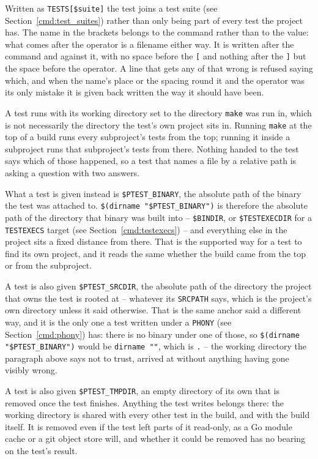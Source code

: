 \documentclass{article}
\begin{document}
Written as \texttt{TESTS[\$suite]} the test joins a test suite (see
Section~\ref{cmd:test_suites}) rather than only being part of every
test the project has.  The name in the brackets belongs to the command
rather than to the value: what comes after the operator is a filename
either way.  It is written after the command and against it, with no
space before the \texttt{[} and nothing after the \texttt{]} but the
space before the operator.  A line that gets any of that wrong is
refused saying which, and when the name's place or the spacing round
it and the operator was its only mistake it is given back written the
way it should have been.

A test runs with its working directory set to the directory
\texttt{make} was run in, which is not necessarily the directory the
test's own project sits in.  Running \texttt{make} at the top of a
build runs every subproject's tests from the top; running it inside a
subproject runs that subproject's tests from there.  Nothing handed to
the test says which of those happened, so a test that names a file by
a relative path is asking a question with two answers.

What a test is given instead is \texttt{\$PTEST\_BINARY}, the absolute
path of the binary the test was attached to.
\texttt{\$(dirname "\$PTEST\_BINARY")} is therefore the absolute path
of the directory that binary was built into -- \texttt{\$BINDIR}, or
\texttt{\$TESTEXECDIR} for a \texttt{TESTEXECS} target (see
Section~\ref{cmd:testexecs}) -- and everything else in the project sits
a fixed distance from there.  That is the supported way for a test to
find its own project, and it reads the same whether the build came
from the top or from the subproject.

A test is also given \texttt{\$PTEST\_SRCDIR}, the absolute path of
the directory the project that owns the test is rooted at -- whatever
its \texttt{SRCPATH} says, which is the project's own directory unless
it said otherwise.  That is the same anchor said a different way, and
it is the only one a test written under a \texttt{PHONY} (see
Section~\ref{cmd:phony}) has: there is no binary under one of those, so
\texttt{\$(dirname "\$PTEST\_BINARY")} would be \texttt{dirname ""},
which is \texttt{.} -- the working directory the paragraph above says
not to trust, arrived at without anything having gone visibly wrong.

A test is also given \texttt{\$PTEST\_TMPDIR}, an empty directory of
its own that is removed once the test finishes.  Anything the test
writes belongs there: the working directory is shared with every other
test in the build, and with the build itself.  It is removed even if
the test left parts of it read-only, as a Go module cache or a git
object store will, and whether it could be removed has no bearing on
the test's result.
\end{document}
